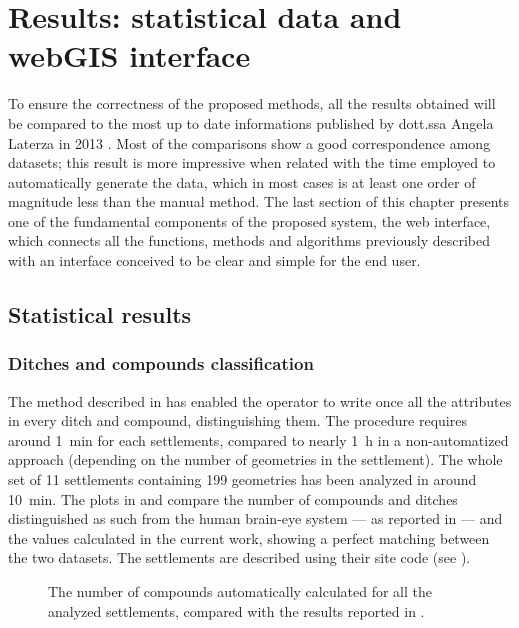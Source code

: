 \chapter{Results: statistical data and webGIS interface}

    \vspace{0.06\textheight}
    \begin{chaptersum}
        \blindtext[2]
    \end{chaptersum}

    To ensure the correctness of the proposed methods, all the results obtained will be compared to the most up to date informations published by dott.ssa Angela Laterza in 2013 \cite{laterza}. Most of the comparisons show a good correspondence among datasets; this result is more impressive when related with the time employed to automatically generate the data, which in most cases is at least one order of magnitude less than the manual method. The last section of this chapter presents one of the fundamental components of the proposed system, the web interface, which connects all the functions, methods and algorithms previously described with an interface conceived to be clear and simple for the end user.

    \section{Statistical results}
        \subsection{Ditches and compounds classification}
            The method described in  has enabled the operator to write once all the attributes in every ditch and compound, distinguishing them. The procedure requires around \SI{1}{\minute} for each settlements, compared to nearly \SI{1}{\hour} in a non-automatized approach (depending on the number of geometries in the settlement). The whole set of 11 settlements containing 199 geometries has been analyzed in around \SI{10}{\minute}. The plots in  and  compare the number of compounds and ditches distinguished as such from the human brain-eye system --- as reported in \cite{laterza} --- and the values calculated in the current work, showing a perfect matching between the two datasets. The settlements are described using their site code (see ).

            \begin{figure}[H]
                \centering
                \begin{tikzpicture}
                    
                \end{tikzpicture}
                \caption[The number of compounds in \cite{laterza} compared to the results of the proposed method.]{The number of compounds automatically calculated for all the analyzed settlements, compared with the results reported in \cite{laterza}.}
                \label{fig:graph-num-compound}
            \end{figure}

